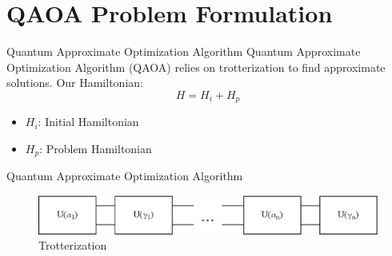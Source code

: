 \documentclass[14pt, aspectratio=169]{beamer}
\begin{document}
\section{QAOA Problem Formulation}

\begin{frame}{Quantum Approximate Optimization Algorithm}
    Quantum Approximate Optimization Algorithm (QAOA) relies on trotterization to find approximate solutions.
    Our Hamiltonian:
    \[H = H_{i} + H_{p}\]
    \begin{itemize}
        \item $H_{i}$: Initial Hamiltonian
        \item $H_{p}$: Problem Hamiltonian
    \end{itemize}
\end{frame}

\begin{frame}{Quantum Approximate Optimization Algorithm}
    \begin{figure}
        \centering
        \includegraphics[width=\linewidth]{images/illustration/QAOA.eps}
        \caption{Trotterization}
        \label{fig:enter-label}
    \end{figure}
\end{frame}
\end{document}
